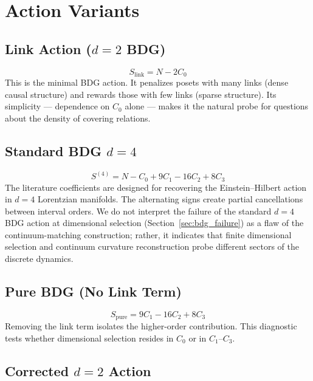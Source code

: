 \documentclass[12pt,a4paper]{article}
\begin{document}
\section{Action Variants}
\label{sec:action_variants}

\subsection{Link Action ($d{=}2$ BDG)}
\label{sec:link_action_def}

\begin{equation}
S_\text{link} = N - 2C_0
\end{equation}
This is the minimal BDG action. It penalizes posets with many links (dense causal structure)
and rewards those with few links (sparse structure). Its simplicity --- dependence on $C_0$
alone --- makes it the natural probe for questions about the density of covering relations.

\subsection{Standard BDG $d{=}4$}
\label{sec:bdg_d4_def}

\begin{equation}
S^{(4)} = N - C_0 + 9C_1 - 16C_2 + 8C_3
\end{equation}
The literature coefficients are designed for recovering the Einstein--Hilbert action in $d = 4$
Lorentzian manifolds. The alternating signs create partial cancellations between interval orders.
We do not interpret the failure of the standard $d{=}4$ BDG action at dimensional
selection (Section~\ref{sec:bdg_failure}) as a flaw of the continuum-matching construction;
rather, it indicates that finite dimensional selection and continuum curvature reconstruction
probe different sectors of the discrete dynamics.

\subsection{Pure BDG (No Link Term)}
\label{sec:pure_bdg_def}

\begin{equation}
S_\text{pure} = 9C_1 - 16C_2 + 8C_3
\end{equation}
Removing the link term isolates the higher-order contribution. This diagnostic tests whether
dimensional selection resides in $C_0$ or in $C_1$--$C_3$.

\subsection{Corrected $d{=}2$ Action}
\label{sec:corrected_d2_def}
\end{document}
